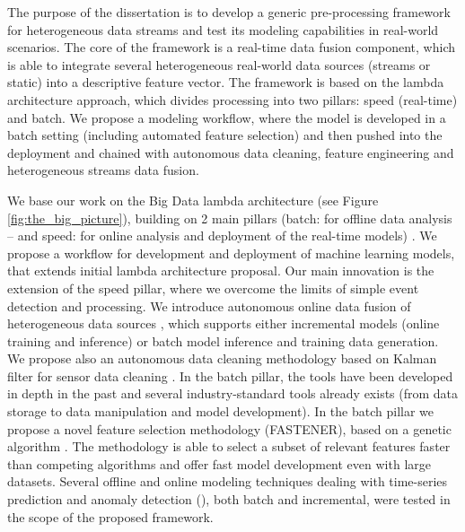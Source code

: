 The purpose of the dissertation is to develop a generic pre-processing framework for heterogeneous data streams and test its modeling capabilities in real-world scenarios. 
The core of the framework is a real-time data fusion component, which is able to integrate several heterogeneous real-world data sources (streams or static) into a descriptive feature vector. 
The framework is based on the lambda architecture approach, which divides processing into two pillars: speed (real-time) and batch. 
We propose a modeling workflow, where the model is developed in a batch setting (including automated feature selection) and then pushed into the deployment and chained with autonomous data cleaning, feature engineering and heterogeneous streams data fusion. 

We base our work on the Big Data lambda architecture (see Figure \ref{fig:the_big_picture}), building on 2 main pillars (batch: for offline data analysis – and speed: for online analysis and deployment of the real-time models) \cite{kenda:2022:water-framework}.
We propose a workflow for development and deployment of machine learning models, that extends initial lambda architecture proposal.
Our main innovation is the extension of the speed pillar, where we overcome the limits of simple event detection and processing.
We introduce autonomous online data fusion of heterogeneous data sources \cite{kenda:2019:fusion}, which supports either incremental models (online training and inference) or batch model inference and training data generation.
We propose also an autonomous data cleaning methodology based on Kalman filter for sensor data cleaning \cite{kenda:2018:autonomous}.
In the batch pillar, the tools have been developed in depth in the past and several industry-standard tools already exists (from data storage to data manipulation and model development).
In the batch pillar we propose a novel feature selection methodology (FASTENER), based on a genetic algorithm \cite{koprivec:2020:fastener}.
The methodology is able to select a subset of relevant features faster than competing algorithms and offer fast model development even with large datasets.
Several offline and online modeling techniques dealing with time-series prediction and anomaly detection (\cite{kenda:2022:water-framework, kenda:2015:modelling, kenda:2015:modelling2, petkovsek:2021:anomaly, costa:2021:entropy}), both batch and incremental, were tested in the scope of the proposed framework.

